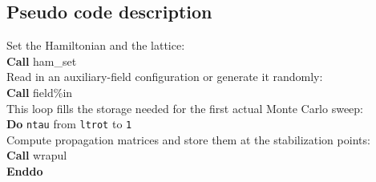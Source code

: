 %
\subsection{Pseudo code description}\label{sec:pseudocode}
%
\begin{mdframed}[frametitle={Basic structure of the auxiliary-field QMC implementation (\path{Prog/main.F90}):}]
{\setlength{\parindent}{0pt}
Set the Hamiltonian and the lattice:\\
\textbf{Call} ham\_set\\
Read in an auxiliary-field configuration or generate it randomly:\\
\textbf{Call} field\%in\\

This loop fills the storage needed for the first actual Monte Carlo sweep:\\
\textbf{Do} \texttt{ntau} from  \texttt{ltrot} to \texttt{1}\\
\hspace*{1em} Compute propagation matrices and store them at the stabilization points:\\
\hspace*{1em} \textbf{Call} wrapul\\
\textbf{Enddo}\\
 
}
\end{mdframed}
